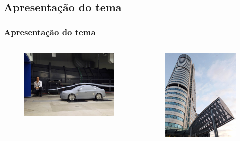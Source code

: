 \subsection{Apresentação do tema}

\begin{frame}
    \frametitle{Apresentação do tema}
    \begin{columns}
        \begin{column}{0.5\textwidth}
            \begin{figure}
            \centering
            \includegraphics[scale = 0.1]{figuras/tuneltema}
            \end{figure}
        \end{column}
        \begin{column}{0.5\textwidth}
            \begin{figure}
            \centering
            \includegraphics[scale = 0.07]{figuras/edificiotema}

\end{figure}
\end{column}
\end{columns}
\end{frame}

